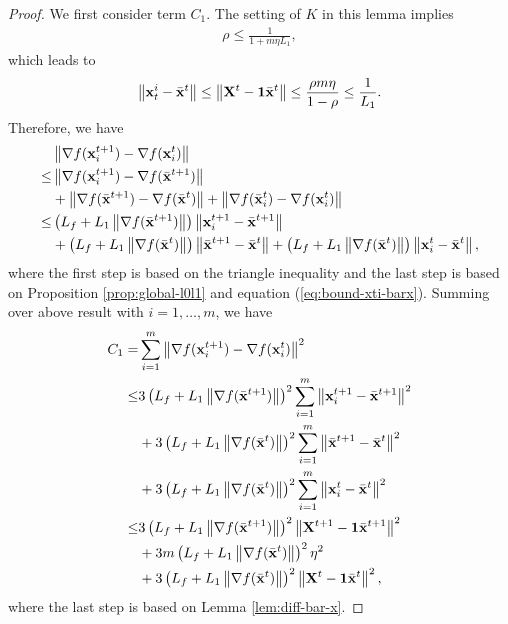 \documentclass[sigconf]{acmart}
\newcommand{\Norm}[1]{\left\| #1 \right\|}
\def\vone{{\bf{1}}}
\def\vx{{\bf{x}}}
\def\mX {{\bf X}}
\theoremstyle{plain}
\def\bx{{\bar\vx}}
\begin{document}
\begin{proof}
We first consider term $C_1$.
The setting of $K$ in this lemma implies 
\begin{align*}
\rho \leq \frac{1}{1+m \eta L_1},
\end{align*}
which leads to
\begin{align}\label{eq:bound-xti-barx}
\Norm{\vx_t^i-\bx^t} \leq \Norm{\mX^t-\vone\bx^t} \leq\frac{\rho m\eta}{1-\rho} \leq \frac{1}{L_1}. 
\end{align}
Therefore, we have
\begin{align*}
& \Norm{\nabla f(\vx^{t+1}_i) - \nabla f(\vx^t_i)} \\
\leq &  \Norm{\nabla f(\vx^{t+1}_i) - \nabla f(\bx^{t+1})} \\
& + \Norm{\nabla f(\bx^{t+1}) - \nabla f(\bx^t)} + \Norm{\nabla f(\bx^t_i) - \nabla f(\vx^t_i)} \\
\leq & \left(L_f+L_1\Norm{\nabla f(\bx^{t+1})}\right)\Norm{\vx^{t+1}_i - \bx^{t+1}} \\
& + \left(L_f+L_1\Norm{\nabla f(\bx^t)}\right)\Norm{\bx^{t+1} - \bx^t}  
  + \left(L_f+L_1\Norm{\nabla f(\bx^t)}\right)\Norm{\vx^{t}_i - \bx^{t}},
\end{align*}
where the first step is based on the triangle inequality and the last step is based on Proposition \ref{prop:global-l0l1} and equation (\ref{eq:bound-xti-barx}).
Summing over above result with $i=1,\dots,m$, we have
\begin{align}\label{eq:diff-grad}
 \begin{split}    
 C_1=&\sum_{i=1}^m\Norm{\nabla f(\vx^{t+1}_i) - \nabla f(\vx^t_i)}^2 \\
\leq & 3\left(L_f+L_1\Norm{\nabla f(\bx^{t+1})}\right)^2\sum_{i=1}^m\Norm{\vx^{t+1}_i - \bx^{t+1}}^2 \\
 & + 3\left(L_f+L_1\Norm{\nabla f(\bx^t)}\right)^2\sum_{i=1}^m\Norm{\bx^{t+1} - \bx^t}^2 \\
 & + 3\left(L_f+L_1\Norm{\nabla f(\bx^t)}\right)^2\sum_{i=1}^m\Norm{\vx^{t}_i - \bx^{t}}^2 \\
\leq & 3  \left(L_f+L_1\Norm{\nabla f(\bx^{t+1})}\right)^2\Norm{\mX^{t+1} - \vone\bx^{t+1}}^2 \\
 & + 3m\left(L_f+L_1\Norm{\nabla f(\bx^t)}\right)^2\eta^2 \\ 
 & + 3\left(L_f+L_1\Norm{\nabla f(\bx^t)}\right)^2\Norm{\mX^{t} - \vone\bx^{t}}^2,
\end{split}
\end{align}
where the last step is based on Lemma \ref{lem:diff-bar-x}.


\end{proof}
\end{document}
